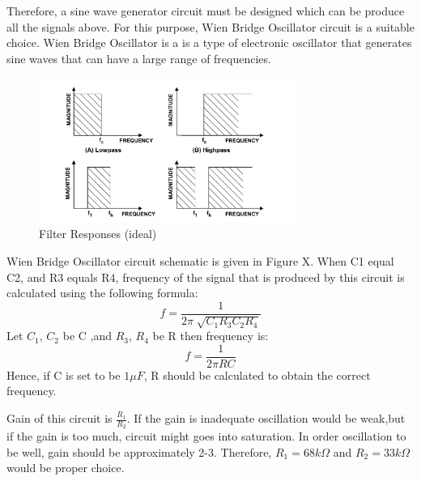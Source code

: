 \documentclass[letterpaper,12pt]{article}
\begin{document}
Therefore, a sine wave generator circuit must be designed which can be produce all the signals above. For this purpose, Wien Bridge Oscillator circuit is a suitable choice. Wien Bridge Oscillator is a is a type of electronic oscillator that generates sine waves that can have a large range of frequencies.
\begin{figure}[H]
    \centering
    \includegraphics[width = 0.75\textwidth]{bandpass.png}
    \caption{Filter Responses (ideal)}
\end{figure} 
Wien Bridge Oscillator circuit schematic is given in Figure X. When C1 equal C2, and R3 equals R4, frequency of the signal that is produced by this circuit is calculated using the following formula:
\[f = \frac{1}{2\pi \sqrt[]{C_1R_3C_2R_4}}\]
Let \(C_1\), \(C_2\) be C ,and \(R_3\), \(R_4\) be R then frequency is:
\[f = \frac{1}{2\pi RC}\]
Hence, if C is set to be \(1\mu F\), R should be calculated to obtain the correct frequency. 

Gain of this circuit is \(\frac{R_1}{R_2}\). If the gain is inadequate oscillation would be weak,but if the gain is too much, circuit might goes into saturation. In order oscillation to be well, gain should be approximately 2-3. Therefore, \(R_1 = 68k\Omega\) and \(R_2 = 33k\Omega\) would be proper choice.
\end{document}
